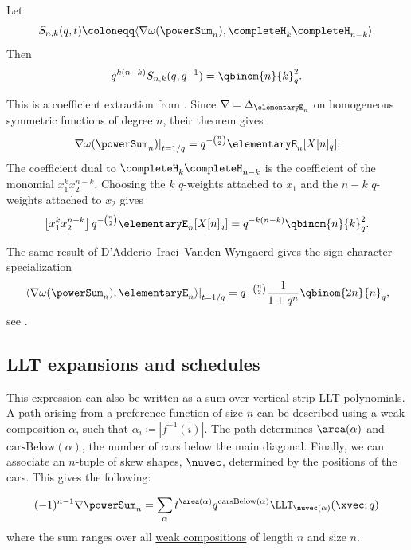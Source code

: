 \begin{proposition}[Specialization at \(t=1/q\)]
Let
\[
  S_{n,k}(q,t)\coloneqq
  \langle \nabla\omega(\powerSum_n),
  \completeH_k\completeH_{n-k}\rangle.
\]
Then
\[
  q^{k(n-k)}S_{n,k}(q,q^{-1})
  =
  \qbinom{n}{k}_q^2.
\]
\end{proposition}
\begin{proof*}
This is a coefficient extraction from
\cite[Thm.~4.30]{DAdderioIraciWyngaerd2022}.  Since
\(\nabla=\Delta_{\elementaryE_n}\) on homogeneous symmetric functions of
degree \(n\), their theorem gives
\[
\left.\nabla\omega(\powerSum_n)\right|_{t=1/q}
=
q^{-\binom{n}{2}}\elementaryE_n[X[n]_q].
\]
The coefficient dual to \(\completeH_k\completeH_{n-k}\) is the coefficient of
the monomial \(x_1^kx_2^{n-k}\).  Choosing the \(k\) \(q\)-weights attached to
\(x_1\) and the \(n-k\) \(q\)-weights attached to \(x_2\) gives
\[
\left[x_1^kx_2^{n-k}\right]
q^{-\binom{n}{2}}\elementaryE_n[X[n]_q]
=
q^{-k(n-k)}\qbinom{n}{k}_q^2.
\]
\end{proof*}

The same result of D'Adderio--Iraci--Vanden Wyngaerd gives the sign-character
specialization
\[
\left.
\langle \nabla\omega(\powerSum_n),\elementaryE_n\rangle
\right|_{t=1/q}
=
q^{-\binom{n}{2}}\frac{1}{1+q^n}\qbinom{2n}{n}_q,
\]
see \cite[Prop.~8.3]{DAdderioIraciWyngaerd2022}.

\subsection[squarePathLLTSchedules]{LLT expansions and schedules}

This expression can also be written as a sum over vertical-strip
\hyperref[lltDefinitionTuples]{LLT polynomials}.
A path arising from a preference function of size $n$ can be described using a weak
composition $\alpha$, such that $\alpha_i \coloneqq |f^{-1}(i)|$.
The path determines $\area(\alpha)$
and $\mathrm{carsBelow}(\alpha)$, the number of cars below the main diagonal.
Finally, we can associate an $n$-tuple of skew shapes, $\nuvec$,
determined by the positions of the cars. This gives the following:
\begin{proposition}
\begin{equation*}
(-1)^{n-1} \nabla \powerSum_n
= \sum_{\alpha} t^{\area(\alpha)} q^{\mathrm{carsBelow}(\alpha)}
\LLT_{\nuvec(\alpha)}(\xvec;q)
\end{equation*}
where the sum ranges over all \hyperref[weakCompositions]{weak compositions} of length $n$ and size $n$.
\end{proposition}


